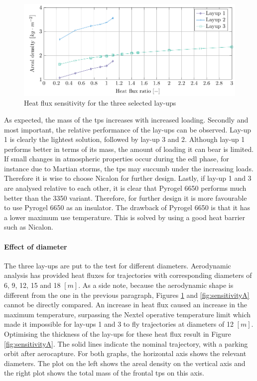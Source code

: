 \begin{figure}[h]
	\centering
	\includegraphics{./Figure/Thermal/Sensitivityq.pdf}
	\caption{Heat flux sensitivity for the three selected lay-ups}
	\label{fig:sensitivityq}
\end{figure}


As expected, the mass of the \gls{tps} increases with increased loading. Secondly and most important, the relative performance of the lay-ups can be observed. Lay-up 1 is clearly the lightest solution, followed by lay-up 3 and 2. Although lay-up 1 performs better in terms of its mass, the amount of loading it can bear is limited. If small changes in atmospheric properties occur during the \gls{edl} phase, for instance due to Martian storms, the \gls{tps} may succumb under the increasing loads. Therefore it is wise to choose Nicalon for further design. Lastly, if lay-up 1 and 3 are analysed relative to each other, it is clear that Pyrogel 6650 performs much better than the 3350 variant. Therefore, for further design it is more favourable to use Pyrogel 6650 as an insulator. The drawback of Pyrogel 6650 is that it has a lower maximum use temperature. This is solved by using a good heat barrier such as Nicalon.

\paragraph{Effect of diameter}
The three lay-ups are put to the test for different diameters. Aerodynamic analysis has provided heat fluxes for trajectories with corresponding diameters of 6, 9, 12, 15 and 18 $\left[ m \right]$. As a side note, because the aerodynamic shape is different from the one in the previous paragraph, Figures \ref{fig:sensitivityq} and \ref{fig:sensitivityA} cannot be directly compared. An increase in heat flux caused an increase in the maximum temperature, surpassing the Nextel operative temperature limit which made it impossible for lay-ups 1 and 3 to fly trajectories at diameters of 12 $\left[ m \right]$. Optimising the thickness of the lay-ups for these heat flux result in Figure \ref{fig:sensitivityA}. The solid lines indicate the nominal trajectory, with a parking orbit after aerocapture. For both graphs, the horizontal axis shows the relevant diameters. The plot on the left shows the areal density on the vertical axis and the right plot shows the total mass of the frontal \gls{tps} on this axis.

